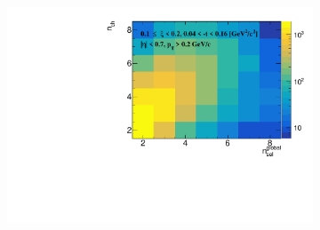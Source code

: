 \begin{figure}[h!]
\begin{subfigure}{.49\textwidth}
	\end{subfigure}
	\begin{subfigure}{.49\textwidth}
		\includegraphics[width=\textwidth,page=1]{chapters/chrgSTAR/img/unfolding/matrix_2.pdf}
	\end{subfigure}
	\begin{minipage}{.49\textwidth}
		\caption{}
		\label{fig:responseSTAR}
	\end{minipage}
\end{figure}
\captionsetup{format=default,indention=0pt,justification=justified}